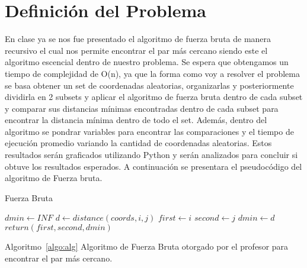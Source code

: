 \section{Definición del Problema}
En clase ya se nos fue presentado el algoritmo de fuerza bruta de manera recursivo el cual nos permite encontrar el par más cercano siendo este el algoritmo escencial dentro de nuestro problema. Se espera que obtengamos un tiempo de complejidad de O(n), ya que la forma como voy a resolver el problema se basa obtener un set de coordenadas aleatorias, organizarlas y posteriormente dividirla en 2 subsets y aplicar el algoritmo de fuerza bruta dentro de cada subset y comparar sus distancias mínimas encontradas dentro de cada subset para encontrar la distancia mínima dentro de todo el set. Además, dentro del algoritmo se pondrar variables para encontrar las comparaciones y el tiempo de ejecución promedio variando la cantidad de coordenadas aleatorias. Estos resultados serán graficados utilizando Python y serán analizados para concluir si obtuve los resultados esperados. A continuación se presentara el pseudocódigo del algoritmo de Fuerza bruta. \\


\begin{algorithm}[H]	%
	\caption{Fuerza Bruta}	%
	\begin{algorithmic}
    \STATE $dmin \gets INF$
            \STATE $d \gets distance(coords, i, j)$
                \STATE $first \gets i$
                \STATE $second \gets j$
                \STATE $dmin \gets d$
            \ENDIF
        \ENDFOR
    \ENDFOR
    \STATE $return(first, second, dmin)$
	\end{algorithmic}
	\label{algo:alg}	%
\end{algorithm} 

Algoritmo~\ref{algo:alg} Algoritmo de Fuerza Bruta otorgado por el profesor para encontrar el par más cercano.